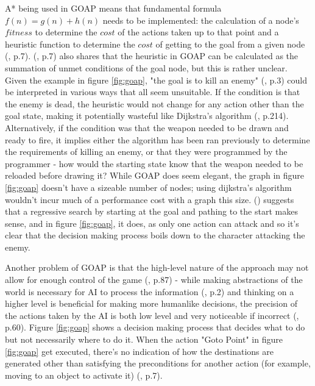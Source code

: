 \documentclass[10pt]{article}
\begin{document}
A* being used in GOAP means that fundamental formula $f(n) = g(n) + h(n)$ needs to be implemented: the calculation of a node's $fitness$ to determine the $cost$ of the actions taken up to that point and a heuristic function to determine the $cost$ of getting to the goal from a given node (\cite{orkin2003applying}, p.7). \citeauthor{orkin2003applying} (\citeyear{orkin2003applying}, p.7) also shares that the heuristic in GOAP can be calculated as the summation of unmet conditions of the goal node, but this is rather unclear. Given the example in figure \ref{fig:goap}, "the goal is to kill an enemy" (\cite{orkin2003applying}, p.3) could be interpreted in various ways that all seem unsuitable. If the condition is that the enemy is dead, the heuristic would not change for any action other than the goal state, making it potentially wasteful like Dijkstra's algorithm (\cite{millington2019ai}, p.214). Alternatively, if the condition was that the weapon needed to be drawn and ready to fire, it implies either the algorithm has been ran previously to determine the requirements of killing an enemy, or that they were programmed by the programmer - how would the starting state know that the weapon needed to be reloaded before drawing it? While GOAP does seem elegant, the graph in figure \ref{fig:goap} doesn't have a sizeable number of nodes; using dijkstra's algorithm wouldn't incur much of a performance cost with a graph this size. \citeauthor{orkin2003applying} (\citeyear{orkin2003applying}) suggests that a regressive search by starting at the goal and pathing to the start makes sense, and in figure \ref{fig:goap}, it does, as only one action can attack and so it's clear that the decision making process boils down to the character attacking the enemy.

Another problem of GOAP is that the high-level nature of the approach may not allow for enough control of the game (\cite{stanciu2012implementing}, p.87) - while making abstractions of the world is necessary for AI to process the information (\cite{buro2004call}, p.2) and thinking on a higher level is beneficial for making more humanlike decisions, the precision of the actions taken by the AI is both low level and very noticeable if incorrect (\cite{graham2003pathfinding}, p.60). Figure \ref{fig:goap} shows a decision making process that decides what to do but not necessarily where to do it. When the action "Goto Point" in figure \ref{fig:goap} get executed, there's no indication of how the destinations are generated other than satisfying the preconditions for another action (for example, moving to an object to activate it) (\cite{orkin2003applying}, p.7). 
\end{document}
